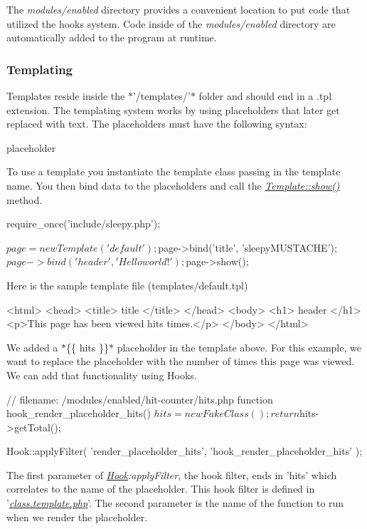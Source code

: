 The {\itshape modules/enabled} directory provides a convenient location to put code that utilized the hooks system. Code inside of the {\itshape modules/enabled} directory are automatically added to the program at runtime.

\subsubsection*{Templating}

Templates reside inside the $\ast$'/templates/'$\ast$ folder and should end in a .tpl extension. The templating system works by using placeholders that later get replaced with text. The placeholders must have the following syntax\-: \begin{DoxyVerb}{{ placeholder }}
\end{DoxyVerb}


To use a template you instantiate the template class passing in the template name. You then bind data to the placeholders and call the {\itshape \hyperlink{class_template_a2b8e3779f5bd8c38f70307574859bd36}{Template\-::show()}} method. \begin{DoxyVerb}require_once('include/sleepy.php');

$page = new Template('default');
$page->bind('title', 'sleepyMUSTACHE');
$page->bind('header', 'Hello world!');
$page->show();
\end{DoxyVerb}


Here is the sample template file (templates/default.\-tpl) \begin{DoxyVerb}<html>
    <head>
        <title>{{ title }}</title>
    </head>
    <body>
        <h1>{{ header }}</h1>
        <p>This page has been viewed {{ hits }} times.</p>
    </body>
</html>
\end{DoxyVerb}


We added a $\ast$\{\{ hits \}\}$\ast$ placeholder in the template above. For this example, we want to replace the placeholder with the number of times this page was viewed. We can add that functionality using Hooks. \begin{DoxyVerb}// filename: /modules/enabled/hit-counter/hits.php
function hook_render_placeholder_hits() {
    $hits = new FakeClass();

    return $hits->getTotal();
}

Hook::applyFilter(
    'render_placeholder_hits',
    'hook_render_placeholder_hits'
);
\end{DoxyVerb}


The first parameter of {\itshape \hyperlink{class_hook}{Hook}\-:apply\-Filter}, the hook filter, ends in 'hits' which correlates to the name of the placeholder. This hook filter is defined in '{\itshape \hyperlink{class_8template_8php}{class.\-template.\-php}}'. The second parameter is the name of the function to run when we render the placeholder.

